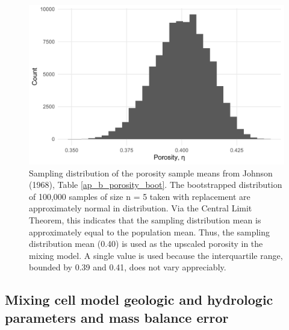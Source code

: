 \begin{figure}[H]
	\includegraphics[width=\textwidth]{ch3_appendix_figs/porosity_boot.pdf}
	\caption{Sampling distribution of the porosity sample means from Johnson (1968), Table \ref{ap_b_porosity_boot}. The bootstrapped distribution of 100,000 samples of size n = 5 taken with replacement are approximately normal in distribution. Via the Central Limit Theorem, this indicates that the sampling distribution mean is approximately equal to the population mean. Thus, the sampling distribution mean (0.40) is used as the upscaled porosity in the mixing model. A single value is used because the interquartile range, bounded by 0.39 and 0.41, does not vary appreciably.}
	\label{ap_b_porosity_boot_hist}
\end{figure}

\egroup



\subsection{Mixing cell model geologic and hydrologic parameters and mass balance error}





\renewcommand{\arraystretch}{1.5}

\setlength{\tabcolsep}{1.5em}

